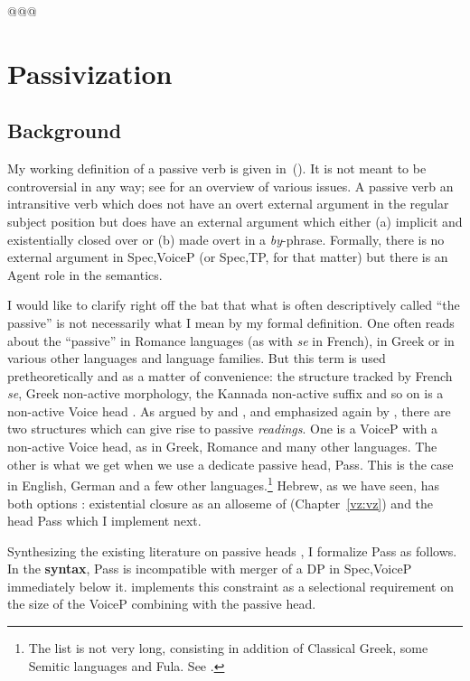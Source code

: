 @@@
\section{Passivization} \label{passn:pass}
	\subsection{Background}
My working definition of a passive verb is given in~(\nextx). It is not meant to be controversial in any way; see \cite{williams15} for an overview of various issues.
\ex A passive verb an intransitive verb which does not have an overt external argument in the regular subject position but does have an external argument which either (a) implicit and existentially closed over or (b) made overt in a \emph{by}-phrase. Formally, there is no external argument in Spec,VoiceP (or Spec,TP, for that matter) but there is an Agent role in the semantics.
\xe

I would like to clarify right off the bat that what is often descriptively called ``the passive'' is not necessarily what I mean by my formal definition. One often reads about the ``passive'' in Romance languages (as with \emph{se} in French), in Greek or in various other languages and language families. But this term is used pretheoretically and as a matter of convenience: the structure tracked by French \emph{se}, Greek non-active morphology, the Kannada non-active suffix \citep{lidz01} and so on is a non-active Voice head \cite{lidz01,labelle08,schaefer17oup}. As argued by \cite{alexiadoudoron12} and \citet[123]{layering15}, and emphasized again by \cite{kastnerzu17}, there are two structures which can give rise to passive \emph{readings}. One is a VoiceP with a non-active Voice head, as in Greek, Romance and many other languages. The other is what we get when we use a dedicate passive head, Pass. This is the case in English, German and a few other languages.\footnote{The list is not very long, consisting in addition of Classical Greek, some Semitic languages and Fula. See \cite{klaiman91}.} Hebrew, as we have seen, has both options \citep{alexiadoudoron12}: existential closure as an alloseme of {\vz} (Chapter~\ref{vz:vz}) and the head Pass which I implement next.

Synthesizing the existing literature on passive heads \citep{bruening13,layering15}, I formalize Pass as follows. In the \textbf{syntax}, Pass is incompatible with merger of a DP in Spec,VoiceP immediately below it. \cite{bruening13} implements this constraint as a selectional requirement on the size of the VoiceP combining with the passive head.

